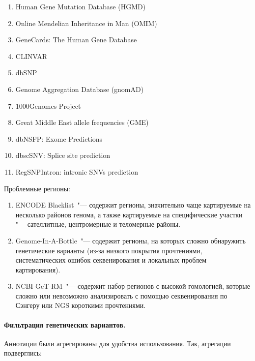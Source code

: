 \documentclass[a4paper,14pt]{extarticle}
\newcommand{\ecitep}[1]{\textenglish{\citep{#1}}}
\begin{document}
\begin{enumerate}
	\item Human Gene Mutation Database (HGMD\textregistered)\,\ecitep{Stenson_2017}
	\item Online Mendelian Inheritance in Man (OMIM\textregistered)\,\ecitep{Amberger_2014}
	\item GeneCards\textregistered: The Human Gene Database\,\ecitep{Stelzer_2016}
	\item CLINVAR\,\ecitep{Landrum_2017}
	\item dbSNP\,\ecitep{Sherry_2001}
	\item Genome Aggregation Database (gnomAD)\,\ecitep{Karczewski_2020}
	\item 1000Genomes Project\,\ecitep{Auton_2015}
	\item Great Middle East allele frequencies (GME)\,\ecitep{Scott_2016}
	\item dbNSFP: Exome Predictions\,\ecitep{Liu_2016}
	\item dbscSNV: Splice site prediction\,\ecitep{Jian_2013}
	\item RegSNPIntron: intronic SNVs prediction\,\ecitep{Lin_2019}
\end{enumerate}

Проблемные регионы:

\begin{enumerate}
 \item ENCODE Blacklist\,\ecitep{Amemiya_2019} "--- содержит регионы, значительно чаще картируемые на несколько районов генома, а также картируемые на специфические участки "--- сателлитные, центромерные и теломерные районы.
 \item Genome-In-A-Bottle\,\ecitep{Zook_2014} "--- содержит регионы, на которых сложно обнаружить генетические варианты (из-за низкого покрытия прочтениями, систематических ошибок секвенирования и локальных проблем картирования).
 \item NCBI GeT-RM\,\ecitep{Mandelker_2016} "--- содержит набор регионов с высокой гомологией, которые сложно или невозможно анализировать с помощью секвенирования по Сэнгеру или NGS короткими прочтениями. 
\end{enumerate}


\paragraph{Фильтрация генетических вариантов.}
Аннотации были агрегированы для удобства использования.
Так, агрегации подверглись:
\end{document}
